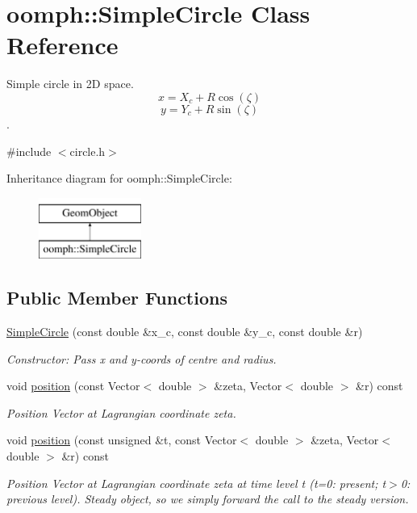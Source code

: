 \hypertarget{classoomph_1_1SimpleCircle}{}\section{oomph\+:\+:Simple\+Circle Class Reference}
\label{classoomph_1_1SimpleCircle}


Simple circle in 2D space. \[ x = X_c + R \cos(\zeta) \] \[ y = Y_c + R \sin(\zeta) \].  




{\ttfamily \#include $<$circle.\+h$>$}

Inheritance diagram for oomph\+:\+:Simple\+Circle\+:\begin{figure}[H]
\begin{center}
\leavevmode
\includegraphics[height=2.000000cm]{classoomph_1_1SimpleCircle}
\end{center}
\end{figure}
\subsection*{Public Member Functions}
\begin{DoxyCompactItemize}
\item 
\hyperlink{classoomph_1_1SimpleCircle_a501ee89b2c05eebad1214b9cc4207176}{Simple\+Circle} (const double \&x\+\_\+c, const double \&y\+\_\+c, const double \&r)
\begin{DoxyCompactList}\small\item\em Constructor\+: Pass x and y-\/coords of centre and radius. \end{DoxyCompactList}\item 
void \hyperlink{classoomph_1_1SimpleCircle_a9b4e845b6e2318779a08c383d094dea5}{position} (const Vector$<$ double $>$ \&zeta, Vector$<$ double $>$ \&r) const
\begin{DoxyCompactList}\small\item\em Position Vector at Lagrangian coordinate zeta. \end{DoxyCompactList}\item 
void \hyperlink{classoomph_1_1SimpleCircle_a3718ee52794c766c9126323e62634db3}{position} (const unsigned \&t, const Vector$<$ double $>$ \&zeta, Vector$<$ double $>$ \&r) const
\begin{DoxyCompactList}\small\item\em Position Vector at Lagrangian coordinate zeta at time level t (t=0\+: present; t$>$0\+: previous level). Steady object, so we simply forward the call to the steady version. \end{DoxyCompactList}\end{DoxyCompactItemize}
